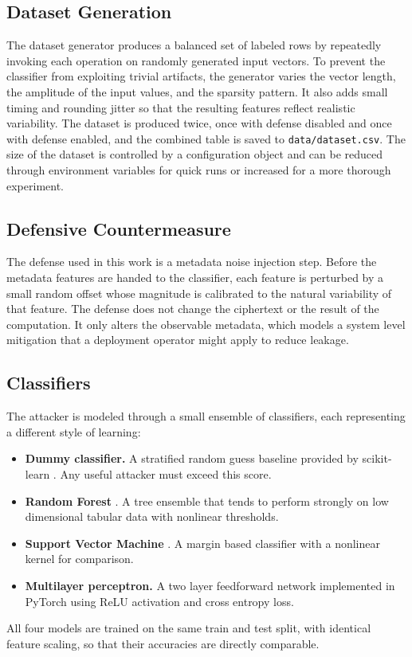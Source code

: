 \documentclass[12pt,a4paper]{article}
\begin{document}
\subsection{Dataset Generation}
The dataset generator produces a balanced set of labeled rows by repeatedly invoking each operation on randomly generated input vectors. To prevent the classifier from exploiting trivial artifacts, the generator varies the vector length, the amplitude of the input values, and the sparsity pattern. It also adds small timing and rounding jitter so that the resulting features reflect realistic variability. The dataset is produced twice, once with defense disabled and once with defense enabled, and the combined table is saved to \texttt{data/dataset.csv}. The size of the dataset is controlled by a configuration object and can be reduced through environment variables for quick runs or increased for a more thorough experiment.

\subsection{Defensive Countermeasure}
The defense used in this work is a metadata noise injection step. Before the metadata features are handed to the classifier, each feature is perturbed by a small random offset whose magnitude is calibrated to the natural variability of that feature. The defense does not change the ciphertext or the result of the computation. It only alters the observable metadata, which models a system level mitigation that a deployment operator might apply to reduce leakage.

\subsection{Classifiers}
The attacker is modeled through a small ensemble of classifiers, each representing a different style of learning:
\begin{itemize}[leftmargin=*]
  \item \textbf{Dummy classifier.} A stratified random guess baseline provided by scikit-learn \cite{pedregosa2011scikit}. Any useful attacker must exceed this score.
  \item \textbf{Random Forest} \cite{breiman2001random}. A tree ensemble that tends to perform strongly on low dimensional tabular data with nonlinear thresholds.
  \item \textbf{Support Vector Machine} \cite{cortes1995support}. A margin based classifier with a nonlinear kernel for comparison.
  \item \textbf{Multilayer perceptron.} A two layer feedforward network implemented in PyTorch \cite{paszke2019pytorch} using ReLU activation and cross entropy loss.
\end{itemize}
All four models are trained on the same train and test split, with identical feature scaling, so that their accuracies are directly comparable.
\end{document}
